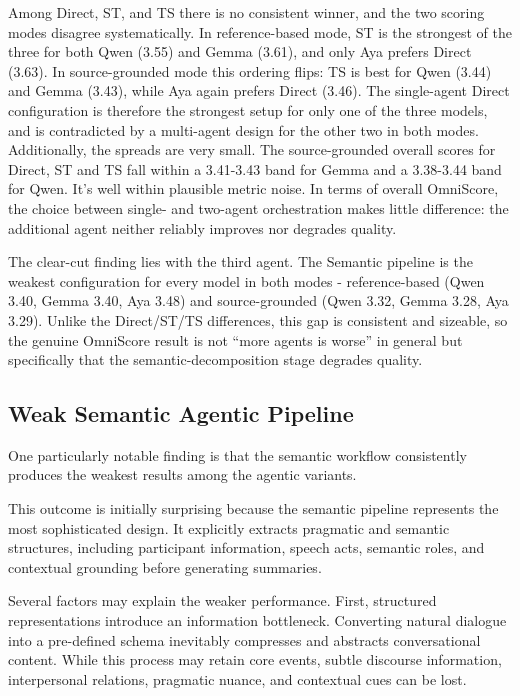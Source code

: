 \documentclass[11pt]{article}
\begin{document}
Among Direct, ST, and TS there is no consistent winner, and the two scoring modes disagree systematically. In reference-based mode, ST is the strongest of the three for both Qwen (3.55) and Gemma (3.61), and only Aya prefers Direct (3.63). In source-grounded mode this ordering flips: TS is best for Qwen (3.44) and Gemma (3.43), while Aya again prefers Direct (3.46). The single-agent Direct configuration is therefore the strongest setup for only one of the three models, and is contradicted by a multi-agent design for the other two in both modes. Additionally, the spreads are very small. The source-grounded overall scores for Direct, ST and TS fall within a 3.41-3.43 band for Gemma and a 3.38-3.44 band for Qwen. It's well within plausible metric noise. In terms of overall OmniScore, the choice between single- and two-agent orchestration makes little difference: the additional agent neither reliably improves nor degrades quality.

The clear-cut finding lies with the third agent. The Semantic pipeline is the weakest configuration for every model in both modes - reference-based (Qwen 3.40, Gemma 3.40, Aya 3.48) and source-grounded (Qwen 3.32, Gemma 3.28, Aya 3.29). Unlike the Direct/ST/TS differences, this gap is consistent and sizeable, so the genuine OmniScore result is not “more agents is worse” in general but specifically that the semantic-decomposition stage degrades quality.




\subsection{Weak Semantic Agentic Pipeline}

One particularly notable finding is that the semantic workflow consistently produces the weakest results among the agentic variants.

This outcome is initially surprising because the semantic pipeline represents the most sophisticated design. It explicitly extracts pragmatic and semantic structures, including participant information, speech acts, semantic roles, and contextual grounding before generating summaries.

Several factors may explain the weaker performance.
First, structured representations introduce an information bottleneck. Converting natural dialogue into a pre-defined schema inevitably compresses and abstracts conversational content. While this process may retain core events, subtle discourse information, interpersonal relations, pragmatic nuance, and contextual cues can be lost.
\end{document}
